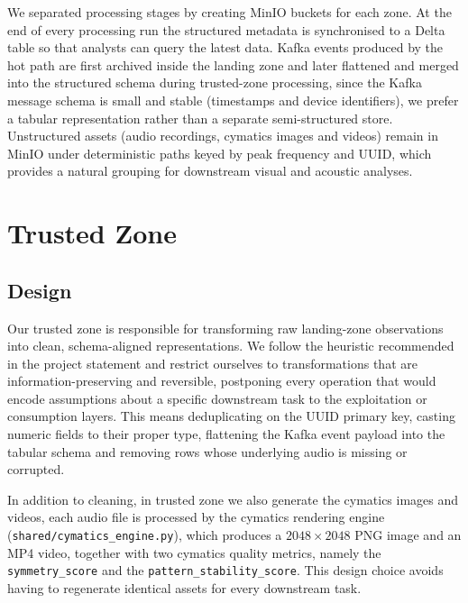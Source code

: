 \documentclass[11pt,a4paper]{article}
\begin{document}
We separated processing stages by creating MinIO buckets for each zone. At the end of every processing run the structured metadata is synchronised to a Delta table so that analysts can query the latest data. Kafka events produced by the hot path are first archived inside the landing zone and later flattened and merged into the structured schema during trusted-zone processing, since the Kafka message schema is small and stable (timestamps and device identifiers), we prefer a tabular representation rather than a separate semi-structured store. Unstructured assets (audio recordings, cymatics images and videos) remain in MinIO under deterministic paths keyed by peak frequency and UUID, which provides a natural grouping for downstream visual and acoustic analyses.


\section{Trusted Zone}

\subsection{Design}
Our trusted zone is responsible for transforming raw landing-zone observations into clean, schema-aligned representations. We follow the heuristic recommended in the project statement and restrict ourselves to transformations that are information-preserving and reversible, postponing every operation that would encode assumptions about a specific downstream task to the exploitation or consumption layers. This means deduplicating on the UUID primary key, casting numeric fields to their proper type, flattening the Kafka event payload into the tabular schema and removing rows whose underlying audio is missing or corrupted.

In addition to cleaning, in trusted zone we also generate the cymatics images and videos, each audio file is processed by the cymatics rendering engine (\texttt{shared/cymatics\_engine.py}), which produces a $2048\times2048$ PNG image and an MP4 video, together with two cymatics quality metrics, namely the \texttt{symmetry\_score} and the \texttt{pattern\_stability\_score}. This design choice avoids having to regenerate identical assets for every downstream task.
\end{document}
